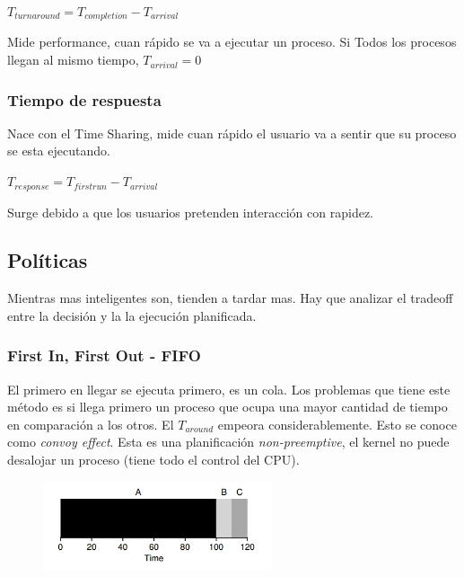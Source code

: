 \documentclass[titlepage,a4paper]{article}
\begin{document}
\begin{center}
\begin{math}
T_{turnaround} = T_{completion} - T_{arrival}
\end{math}
\end{center}

Mide performance, cuan rápido se va a ejecutar un proceso. Si Todos los procesos llegan al mismo tiempo, $T_{arrival} = 0$

\subsubsection*{Tiempo de respuesta}
Nace con el Time Sharing, mide cuan rápido el usuario va a sentir que su proceso se esta ejecutando.

\begin{center}
\begin{math}
T_{response} = T_{firstrun} - T_{arrival}
\end{math}
\end{center}

Surge debido a que los usuarios pretenden interacción con rapidez.


\subsection*{Políticas}
Mientras mas inteligentes son, tienden a tardar mas. Hay que analizar el tradeoff entre la decisión y la la ejecución planificada.

\subsubsection*{First In, First Out - FIFO}
El primero en llegar se ejecuta primero, es un cola. Los problemas que tiene este método es si llega primero un proceso que ocupa una mayor cantidad de tiempo en comparación a los otros. El $T_{around}$ empeora considerablemente. Esto se conoce como \textit{convoy effect}. Esta es una planificación \emph{non-preemptive}, el kernel no puede desalojar un proceso (tiene todo el control del CPU).

\begin{figure}[!htb]
    \centering
    \includegraphics[width=0.6\textwidth]{ImagenesApunte/fifo_convoy.jpg}
\end{figure}
\end{document}
